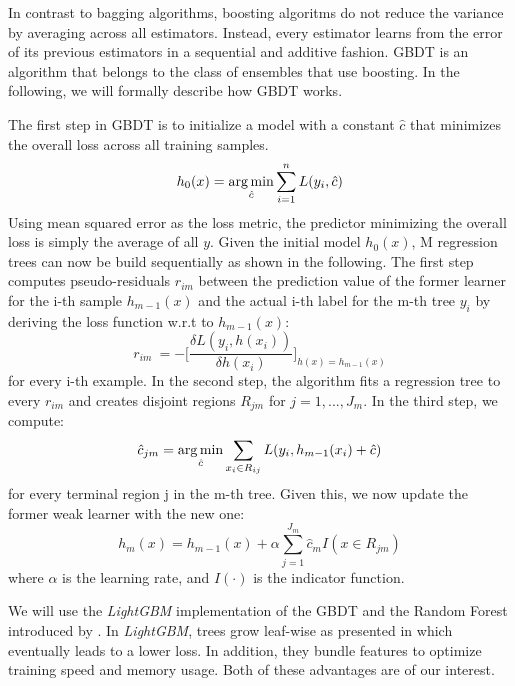 In contrast to bagging algorithms, boosting algoritms do not reduce the variance by averaging across all estimators. Instead, every estimator learns from the error of its previous estimators in a sequential and additive fashion. GBDT is an algorithm that belongs to the class of ensembles that use boosting. In the following, we will formally describe how GBDT works.

The first step in GBDT is to initialize a model with a constant $ \hat{c} $ that minimizes the overall loss across all training samples.
\begin{equation}
h_{0}(x) =  \operatorname*{arg\,min}_{\hat{c}} \sum_{i=1}^n L(y_i,\hat{c}) \label{gbdt_step1}
\end{equation}
Using mean squared error as the loss metric, the predictor minimizing the overall loss is simply the average of all $ y $.
Given the initial model $ h_0(x) $, M regression trees can now be build sequentially as shown in the following. 
The first step computes pseudo-residuals $ r_{im} $ between the prediction value of the former learner for the i-th sample $ h_{m-1}(x) $ and the actual i-th label for the m-th tree $ y_i $ by deriving the loss function w.r.t to $ h_{m-1}(x) $: 
\begin{equation}
	r_{im}\ = - \bigg[\dfrac{\delta L(y_i, h(x_i))}{\delta h(x_i)}\bigg]_{h(x) = h_{m-1}(x)}
\end{equation} 
for every i-th example.
In the second step, the algorithm fits a regression tree to every $ r_{im} $ and creates disjoint regions $ R_{jm} $ for $j = 1, ..., J_m$. 
In the third step, we compute: 
\begin{equation}
	\hat{c}_{jm} = \operatorname*{arg\,min}_{\hat{c}} \sum_{x_i \in R_{ij}} L(y_i, h_{m-1}(x_i) + \hat{c})
\end{equation}
for every terminal region j in the m-th tree. 
Given this, we now update the former weak learner with the new one:
\begin{equation}
	h_m(x) = h_{m-1}(x) + \alpha \sum_{j=1}^{J_m} \hat{c}_{m}I(x \in R_{jm})
\end{equation}
where $ \alpha $ is the learning rate, and $ I(\cdot) $ is the indicator function.

We will use the \textit{LightGBM} implementation of the GBDT and the Random Forest introduced by \cite{lightgbm}. In \textit{LightGBM}, trees grow leaf-wise as presented in \cite{BestFirst} which eventually leads to a lower loss. In addition, they bundle features to optimize training speed and memory usage. Both of these advantages are of our interest. 